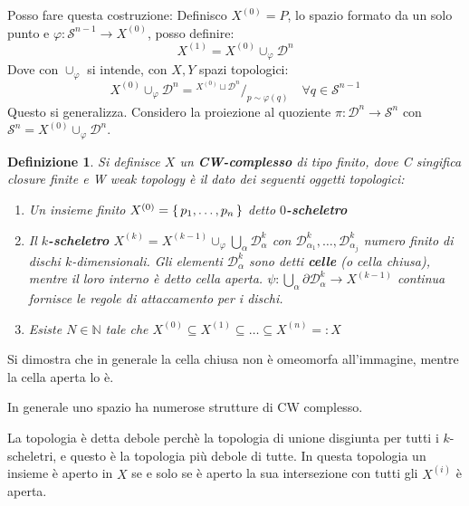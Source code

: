 \documentclass[10pt, twoside=false, x11names]{scrbook}
\newtheorem{definition}[theorem]{Definizione}
\renewcommand{\phi}{\varphi}
\newcommand{\Sph}[1][]{\mathcal{S}^#1}
\newcommand{\Disk}[1][]{\mathcal{D}^#1}
\newcommand*\quot[2]{{^{\textstyle #1}\big/_{\textstyle #2}}}
\begin{document}
Posso fare questa costruzione:
Definisco $ X^{(0)} = P $, lo spazio formato da un solo punto
e $ \phi \colon \Sph{n-1} \to X^{(0)} $, posso definire:
\[
  X^{(1)} = X^{(0)} \cup_\phi \Disk{n}
\]
Dove con $ \cup_\phi $ si intende, con $ X, Y $ spazi topologici:
\[
  X^{(0)} \cup_\phi \Disk{n} = \quot{X^{(0)} \sqcup \Disk{n}}{p \sim \phi(q)} \quad \forall q \in \Sph{n-1}
\]
Questo si generalizza. Considero la proiezione al quoziente $ \pi \colon \Disk{n} \to \Sph{n} $
con $ \Sph{n} = X^{(0)} \cup_\phi \Disk{n} $.

\begin{definition}
  Si definisce $ X $ un \textbf{CW-complesso} di tipo finito, dove C singifica
  \emph{closure finite} e W \emph{weak topology} è il dato dei seguenti oggetti topologici:
  \begin{enumerate}
  \item Un insieme finito $ X^{(0)} = \set{p_1, \dots, p_n} $ detto \textbf{$ 0 $-scheletro}
  \item Il \textbf{$ k $-scheletro} $ X^{(k)} = X^{(k-1)} \cup_\phi \bigcup_\alpha \Disk{k}_\alpha $
    con $ \Disk{k}_{\alpha_1}, \dots,  \Disk{k}_{\alpha_j} $ numero finito di dischi $ k $-dimensionali.
    Gli elementi $ \Disk{k}_\alpha $ sono detti \textbf{celle} (o cella chiusa), mentre
    il loro interno è detto cella aperta.
    $ \psi \colon \bigcup_\alpha \partial \Disk{k}_\alpha \to X^{(k-1)} $ continua fornisce le regole di attaccamento per i dischi.
  \item Esiste $ N \in \mathbb{N} $ tale che $ X^{(0)} \subseteq X^{(1)} \subseteq \dots \subseteq X^{(n)} =: X $
  \end{enumerate}
\end{definition}

Si dimostra che in generale la cella chiusa non è omeomorfa all'immagine, mentre la cella
aperta lo è.

In generale uno spazio ha numerose strutture di CW complesso.

La topologia è detta debole perchè la topologia di unione disgiunta per tutti i $ k $-scheletri,
e questo è la topologia più debole di tutte. In questa topologia un insieme è aperto in $ X $
se e solo se è aperto la sua intersezione con tutti gli $ X^{(i)} $ è aperta.
\end{document}
